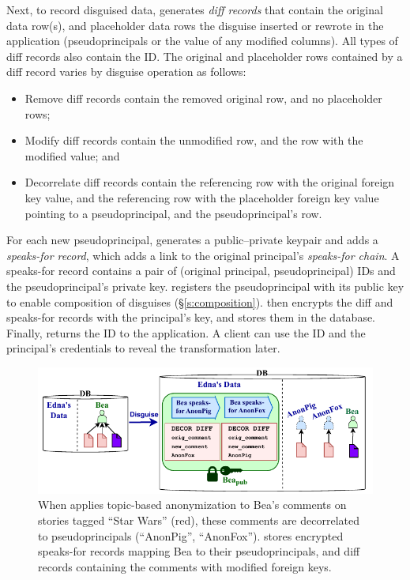 %
Next, to record disguised data, \sys generates \emph{diff records} that contain \one{}
the original data row(s), and \two{} placeholder data rows the disguise inserted
or rewrote in the application (\eg pseudoprincipals or the value of any modified
columns).
%
All types of diff records also contain the \xx ID. 
%
The original and placeholder rows contained by a diff record varies by disguise
operation as follows:
\begin{itemize}[nosep]
    \item Remove diff records contain \one{} the removed original row, and \two{} no
        placeholder rows;
    \item Modify diff records contain \one{} the unmodified row, and \two{} the
        row with the modified value; and
    \item Decorrelate diff records contain \one{} the referencing row with the original
        foreign key value, and \two{} the referencing row with the placeholder
        foreign key value pointing to a pseudoprincipal, and the pseudoprincipal's row.
\end{itemize}
%
For each new pseudoprincipal, \sys generates a public--private keypair and adds
a \emph{speaks-for record}, which adds a link to the original principal's
\emph{speaks-for chain}.
A speaks-for record contains a pair of (original principal,
pseudoprincipal) IDs and the pseudoprincipal’s
private key. \sys registers the pseudoprincipal with its public key to enable
composition of disguises (\S\ref{s:composition}).
%
\sys then encrypts the diff and speaks-for records with the principal's key,
and stores them in the database.
%
%
%
Finally, \sys returns the \xx ID to the application.
%
A client can use the \xx ID and the principal's
credentials to reveal the transformation later.
%

\begin{figure}[!t]
\centering
\includegraphics{figs/lobsters_catanon_visual}
\caption{When \sys applies topic-based anonymization to Bea's comments on
    stories tagged ``Star Wars'' (red), these comments are decorrelated to
    pseudoprincipals (``AnonPig'', ``AnonFox''). \sys stores encrypted
    speaks-for records mapping Bea to their
    pseudoprincipals, and diff records containing the comments with
    modified foreign keys.}
\label{f:lobsters_visual}
\end{figure}


